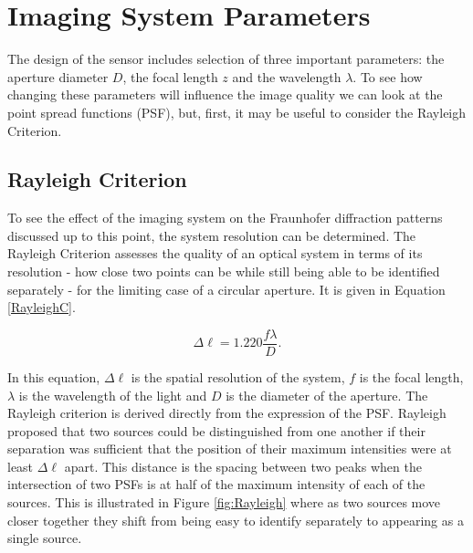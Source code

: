 \section{Imaging System Parameters}

The design of the sensor includes selection of three important parameters: the aperture diameter $D$, the focal length $z$ and the wavelength $\lambda$.  To see how changing these parameters will influence the image quality we can look at the point spread functions (PSF), but, first, it may be useful to consider the Rayleigh Criterion.

\subsection{Rayleigh Criterion}
To see the effect of the imaging system on the Fraunhofer diffraction patterns discussed up to this point, the system resolution can be determined.  The Rayleigh Criterion assesses the quality of an optical system in terms of its resolution - how close two points can be while still being able to be identified separately - for the limiting case of a circular aperture.  It is given in Equation \ref{RayleighC}.

\begin{equation}
\label{RayleighC}
	 \Delta \ell = 1.220 \frac{ f \lambda}{D}.
\end{equation}

In this equation, $\Delta \ell$ is the spatial resolution of the system, $f$ is the focal length, $\lambda$ is the wavelength of the light and $D$ is the diameter of the aperture.  The Rayleigh criterion is derived directly from the expression of the PSF.  Rayleigh proposed that two sources could be distinguished from one another if their separation was sufficient that the position of their maximum intensities were at least $\Delta \ell$ apart.  This distance is the spacing between two peaks when the intersection of two PSFs is at half of the maximum intensity of each of the sources. This is illustrated in Figure \ref{fig:Rayleigh} where as two sources move closer together they shift from being easy to identify separately to appearing as a single source.

